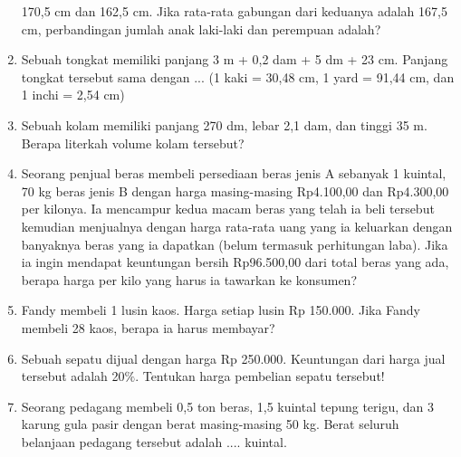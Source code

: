 \documentclass[12pt,a4paper,draft,final,oneside,twoside,openright,openany]{article}
\begin{document}
\begin{enumerate}
		170,5 cm dan 162,5 cm. Jika rata-rata gabungan
		dari keduanya adalah 167,5 cm, perbandingan
		jumlah anak laki-laki dan perempuan adalah?
		\item Sebuah tongkat memiliki panjang 3 m + 0,2
		dam + 5 dm + 23 cm. Panjang tongkat tersebut
		sama dengan ... (1 kaki = 30,48 cm, 1 yard =
		91,44 cm, dan 1 inchi = 2,54 cm)
		\item Sebuah kolam memiliki panjang 270 dm,
		lebar 2,1 dam, dan tinggi 35 m. Berapa literkah
		volume kolam tersebut?
		\item Seorang penjual beras membeli persediaan
		beras jenis A sebanyak 1 kuintal, 70 kg beras
		jenis B dengan harga masing-masing
		Rp4.100,00 dan Rp4.300,00 per kilonya. Ia
		mencampur kedua macam beras yang telah ia
		beli tersebut kemudian menjualnya dengan
		harga rata-rata uang yang ia keluarkan dengan
		banyaknya beras yang ia dapatkan (belum
		termasuk perhitungan laba). Jika ia ingin
		mendapat keuntungan bersih Rp96.500,00 dari
		total beras yang ada, berapa harga per kilo yang
		harus ia tawarkan ke konsumen?
		\item Fandy membeli 1 lusin kaos. Harga setiap lusin Rp 150.000. Jika Fandy membeli 
		28 kaos, berapa ia harus membayar?
		\item Sebuah sepatu dijual dengan harga Rp 250.000. Keuntungan dari harga jual 
		tersebut adalah 20$\%$. Tentukan harga pembelian sepatu tersebut!
		\item Seorang pedagang membeli 0,5 ton beras, 1,5 kuintal tepung terigu, dan 3 
		karung gula pasir dengan berat masing-masing 50 kg. Berat seluruh belanjaan 
		pedagang tersebut adalah .... kuintal.
	\end{enumerate}
\end{document}
